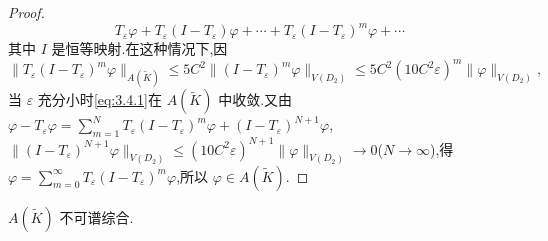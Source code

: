 \begin{proof}
\begin{equation}
T_{\varepsilon}\varphi + T_{\varepsilon}(I - T_{\varepsilon})\varphi + \cdots + T_{\varepsilon}(I - T_{\varepsilon})^{m}\varphi + \cdots
\label{eq:3.4.1}\end{equation}
其中 $I$ 是恒等映射.在这种情况下,因
\begin{equation*}
\|T_{\varepsilon}(I - T_{\varepsilon})^{m}\varphi\|_{A(\widetilde{K})} \leq 5C^{2}\|(I - T_{\varepsilon})^{m}\varphi\|_{V(D_{2})} \leq 5C^{2}(10C^{2}\varepsilon)^{m}\|\varphi\|_{V(D_{2})},
\end{equation*}
当 $\varepsilon$ 充分小时\eqref{eq:3.4.1}在 $A(\widetilde{K})$ 中收敛.又由 $\varphi - T_{\varepsilon}\varphi = \sum_{m=1}^{N}T_{\varepsilon}(I - T_{\varepsilon})^{m}\varphi + (I - T_{\varepsilon})^{N+1}\varphi$,$\|(I - T_{\varepsilon})^{N+1}\varphi\|_{V(D_{2})} \leq (10C^{2}\varepsilon)^{N+1}\|\varphi\|_{V(D_{2})} \to 0$($N \to \infty$),得 $\varphi = \sum_{m=0}^{\infty}T_{\varepsilon}(I - T_{\varepsilon})^{m}\varphi$,所以 $\varphi \in A(\widetilde{K})$.
\end{proof}

\begin{theorem}\label{thm:3.4.12}
$A(\widetilde{K})$ 不可谱综合.
\end{theorem}

